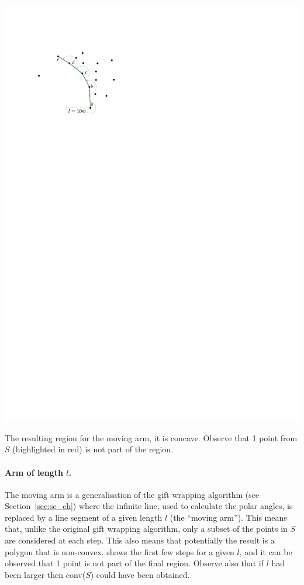\begin{marginfigure}
  \centering
  \includegraphics[page=3,width=.9\textwidth]{figs/movingarm.pdf}
  \caption{The resulting region for the moving arm, it is concave. Observe that 1 point from $S$ (highlighted in red) is not part of the region.}%
\end{marginfigure}

\paragraph{Arm of length $l$.} 
The moving arm is a generalisation of the gift wrapping algorithm (see Section~\ref{sec:se_ch}) where the infinite line, used to calculate the polar angles, is replaced by a line segment of a given length $l$ (the ``moving arm'').
This means that, unlike the original gift wrapping algorithm, only a subset of the points in $S$ are considered at each step.
This also means that potentially the result is a polygon that is non-convex.
 shows the first few steps for a given $l$, and it can be observed that 1 point is not part of the final region.
Observe also that if $l$ had been larger then conv($S$) could have been obtained.



